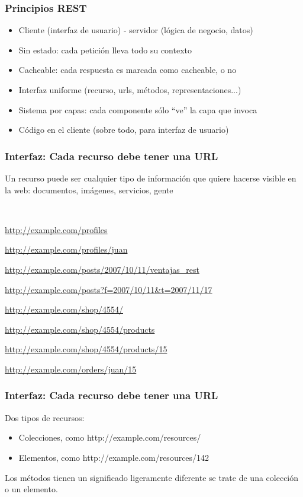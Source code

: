 
\begin{frame}
\frametitle{Principios REST}

\begin{itemize}
\item Cliente (interfaz de usuario) - servidor (lógica de negocio, datos)
\item Sin estado: cada petición lleva todo su contexto
\item Cacheable: cada respuesta es marcada como cacheable, o no
\item Interfaz uniforme (recurso, urls, métodos, representaciones...)
\item Sistema por capas: cada componente sólo ``ve'' la capa que invoca
\item Código en el cliente (sobre todo, para interfaz de usuario)
\end{itemize}

\end{frame}

\begin{frame}
\frametitle{Interfaz: Cada recurso debe tener una URL}

Un recurso puede ser cualquier tipo de información que quiere hacerse visible en la web: documentos, imágenes, servicios, gente

~

\url{http://example.com/profiles}

\url{http://example.com/profiles/juan}

\url{http://example.com/posts/2007/10/11/ventajas_rest}

\url{http://example.com/posts?f=2007/10/11&t=2007/11/17}

\url{http://example.com/shop/4554/}

\url{http://example.com/shop/4554/products}

\url{http://example.com/shop/4554/products/15}

\url{http://example.com/orders/juan/15}

\end{frame}

\begin{frame}
\frametitle{Interfaz: Cada recurso debe tener una URL}

Dos tipos de recursos:

\begin{itemize}
  \item Colecciones, como http://example.com/resources/
  \item Elementos, como http://example.com/resources/142
\end{itemize}

Los métodos tienen un significado ligeramente diferente se trate de
una colección o un elemento.

\end{frame}


